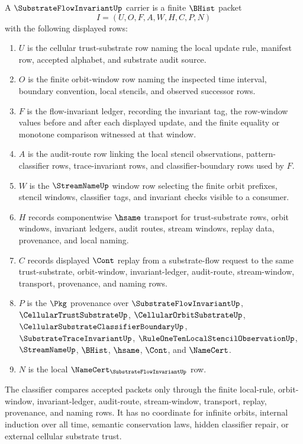 \begin{definition}
\label{def:substrate-flow-invariant-carrier}
A $\SubstrateFlowInvariantUp$ carrier is a finite $\BHist$ packet
$$
I=(U,O,F,A,W,H,C,P,N)
$$
with the following displayed rows:
\begin{enumerate}
\item $U$ is the cellular trust-substrate row naming the local update rule, manifest row, accepted alphabet, and substrate audit source.
\item $O$ is the finite orbit-window row naming the inspected time interval, boundary convention, local stencils, and observed successor rows.
\item $F$ is the flow-invariant ledger, recording the invariant tag, the row-window values before and after each displayed update, and the finite equality or monotone comparison witnessed at that window.
\item $A$ is the audit-route row linking the local stencil observations, pattern-classifier rows, trace-invariant rows, and classifier-boundary rows used by $F$.
\item $W$ is the $\StreamNameUp$ window row selecting the finite orbit prefixes, stencil windows, classifier tags, and invariant checks visible to a consumer.
\item $H$ records componentwise $\hsame$ transport for trust-substrate rows, orbit windows, invariant ledgers, audit routes, stream windows, replay data, provenance, and local naming.
\item $C$ records displayed $\Cont$ replay from a substrate-flow request to the same trust-substrate, orbit-window, invariant-ledger, audit-route, stream-window, transport, provenance, and naming rows.
\item $P$ is the $\Pkg$ provenance over $\SubstrateFlowInvariantUp$, $\CellularTrustSubstrateUp$, $\CellularOrbitSubstrateUp$, $\CellularSubstrateClassifierBoundaryUp$, $\SubstrateTraceInvariantUp$, $\RuleOneTenLocalStencilObservationUp$, $\StreamNameUp$, $\BHist$, $\hsame$, $\Cont$, and $\NameCert$.
\item $N$ is the local $\NameCert_{\SubstrateFlowInvariantUp}$ row.
\end{enumerate}
The classifier compares accepted packets only through the finite local-rule, orbit-window, invariant-ledger, audit-route, stream-window, transport, replay, provenance, and naming rows. It has no coordinate for infinite orbits, internal induction over all time, semantic conservation laws, hidden classifier repair, or external cellular substrate trust.
\end{definition}

